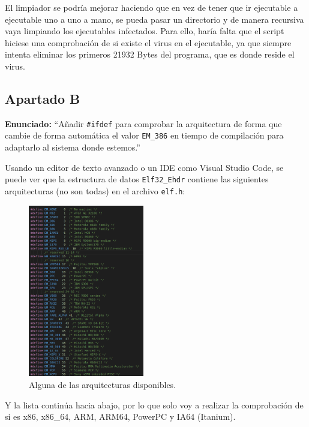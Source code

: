 \documentclass{article}
\begin{document}
El limpiador se podría mejorar haciendo que en vez de tener que ir ejecutable a ejecutable uno a uno a mano, se pueda pasar un directorio y de manera recursiva vaya limpiando los ejecutables infectados. Para ello, haría falta que el script hiciese una comprobación de si existe el virus en el ejecutable, ya que siempre intenta eliminar los primeros 21932 Bytes del programa, que es donde reside el virus.

\subsection{Apartado B}

\textbf{Enunciado: }``Añadir \verb|#ifdef| para comprobar la arquitectura de forma que cambie de forma automática el valor \verb|EM_386| en tiempo de compilación para adaptarlo al sistema donde estemos.''

\bigskip

Usando un editor de texto avanzado o un IDE como Visual Studio Code, se puede ver que la estructura de datos \verb|Elf32_Ehdr| contiene las siguientes arquitecturas (no son todas) en el archivo \verb|elf.h|:

\begin{figure}[H]
    \centering
    \includegraphics[width=0.45\textwidth]{imagenes/Captura desde 2022-11-23 13-07-09.png}
    \caption{Alguna de las arquitecturas disponibles.}
\end{figure}

Y la lista continúa hacia abajo, por lo que solo voy a realizar la comprobación de si es x86, x86\_64, ARM, ARM64, PowerPC y IA64 (Itanium). 

\newpage
\end{document}
